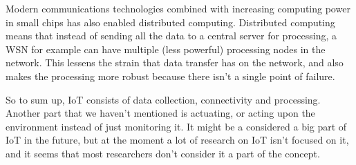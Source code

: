 Modern communications technologies combined with increasing computing power in
small chips has also enabled distributed computing.  Distributed computing
means that instead of sending all the data to a central server for processing,
a WSN for example can have multiple (less powerful) processing nodes in the
network. This lessens the strain that data transfer has on the network, and
also makes the processing more robust because there isn't a single point of
failure.~\cite{Yu2006}

So to sum up, IoT consists of data collection, connectivity and processing.
Another part that we haven't mentioned is actuating, or acting upon the
environment instead of just monitoring it. It might be a considered a big part
of IoT in the future, but at the moment a lot of research on IoT isn't focused
on it, and it seems that most researchers don't consider it a part of the
concept.
